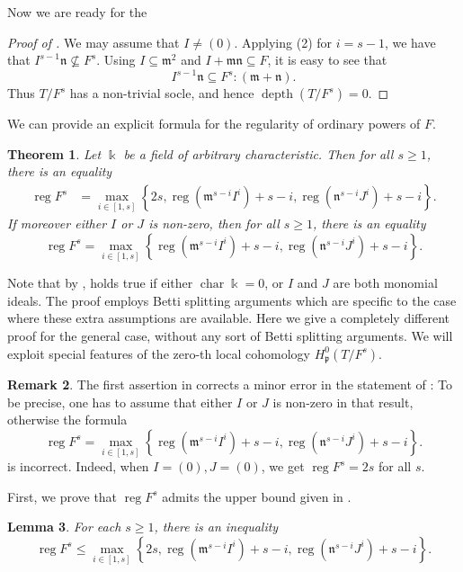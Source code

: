 \documentclass{amsart}
\DeclareMathOperator{\chara}{char}
\DeclareMathOperator{\depth}{depth}
\DeclareMathOperator{\reg}{reg}
\newcommand{\mm}{\mathfrak{m}}
\newcommand{\nn}{\mathfrak{n}}
\newcommand{\pp}{\mathfrak{p}}
\theoremstyle{plain}
\newtheorem{thm}{Theorem}[section]
\newtheorem{lem}[thm]{Lemma}
\theoremstyle{definition}
\newtheorem{rem}[thm]{Remark}
\numberwithin{equation}{section}
\newcommand{\kk}{\Bbbk}
\begin{document}
Now we are ready for the
\begin{proof}[Proof of ]
We may assume that $I\neq (0)$. Applying (2) for $i=s-1$, we have that $I^{s-1}\nn \not\subseteq F^s$. Using $I\subseteq \mm^2$ and $I+\mm\nn\subseteq F$, it is easy to see that 
$$
I^{s-1}\nn \subseteq F^s:(\mm+\nn).
$$
Thus $T/F^s$ has a non-trivial socle, and hence $\depth(T/F^s)=0$.
\end{proof}


We can provide an explicit formula for the regularity of ordinary powers of $F$.
\begin{thm}
\label{thm_reg_ordinarypow}
Let $\kk$ be a field of arbitrary characteristic. Then for  all $s\ge 1$, there is an equality
\begin{align*}
\reg F^s &= \max \limits_{i\in [1,s]} \left\{2s,\reg(\mm^{s-i}I^i)+s-i, \reg(\nn^{s-i}J^i)+s-i\right\}.
\end{align*}
If moreover either $I$ or $J$ is non-zero, then for all $s\ge 1$, there is an equality
\[
\reg F^s = \max \limits_{i\in [1,s]} \left\{\reg(\mm^{s-i}I^i)+s-i, \reg(\nn^{s-i}J^i)+s-i\right\}.
\]
\end{thm}
Note that by \cite[Theorem 5.1]{NgV19b},  holds true if either $\chara \kk=0$, or $I$ and $J$ are both monomial ideals. The proof employs Betti splitting arguments which are specific to the case where these extra assumptions are available. Here we give a completely different proof for the general case, without any sort of Betti splitting arguments. We will exploit special features of the zero-th local cohomology $H^0_\pp(T/F^s)$.
\begin{rem}
The first assertion in  corrects a minor error in the statement of \cite[Theorem 5.1]{NgV19b}: To be precise, one has to assume that either $I$ or $J$ is non-zero in that result, otherwise the formula 
\[
\reg F^s = \max \limits_{i\in [1,s]} \left\{\reg(\mm^{s-i}I^i)+s-i, \reg(\nn^{s-i}J^i)+s-i\right\}.
\]
is incorrect. Indeed, when $I=(0), J=(0)$, we get $\reg F^s=2s$ for all $s$.
\end{rem}
First, we prove that $\reg F^s$ admits the upper bound given in .
\begin{lem}
\label{lem_upperbound}
For each $s\ge 1$, there is an inequality
\[
\reg F^s \le \max \limits_{i\in [1,s]} \left\{2s,\reg(\mm^{s-i}I^i)+s-i, \reg(\nn^{s-i}J^i)+s-i\right\}. 
\]
\end{lem}
\end{document}
